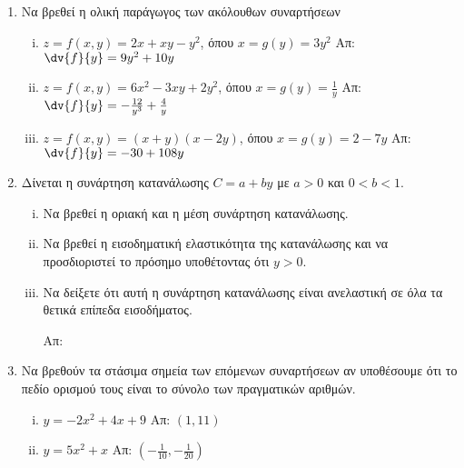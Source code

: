 \begin{enumerate}
  \item Να βρεθεί η ολική παράγωγος των ακόλουθων συναρτήσεων

    \begin{enumerate}[i)]
      \item $ z = f(x,y) = 2x+xy-y^{2} $, όπου $ x = g(y) = 3y^{2} 
        $ \hfill Απ: $ \dv{f}{y} = 9y^{2}+10y $ 
      \item $ z = f(x,y) = 6x^{2}-3xy+2y^{2} $, όπου $ x = g(y) = \frac{1}{y} $
        \hfill Απ: $ \dv{f}{y} = - \frac{12}{y^{3}} + \frac{4}{y} $
      \item $ z = f(x,y) = (x+y)(x-2y) $, όπου $ x = g(y) = 2-7y $
        \hfill Απ: $ \dv{f}{y} = -30 + 108y $ 
    \end{enumerate}

  \item Δίνεται η συνάρτηση κατανάλωσης $ C=a+by $ με $ a>0 $ και $ 0<b<1 $.

    \begin{enumerate}[i)]
      \item Να βρεθεί η οριακή και η μέση συνάρτηση κατανάλωσης. 
      \item Να βρεθεί η εισοδηματική ελαστικότητα της κατανάλωσης και να προσδιοριστεί το
        πρόσημο υποθέτοντας ότι $ y>0 $. 
      \item Να δείξετε ότι αυτή η συνάρτηση κατανάλωσης είναι ανελαστική σε όλα τα θετικά
        επίπεδα εισοδήματος. 

        \hfill Απ:  
    \end{enumerate}

  \item Να βρεθούν τα στάσιμα σημεία των επόμενων συναρτήσεων αν υποθέσουμε ότι το πεδίο ορισμού
    τους είναι το σύνολο των πραγματικών αριθμών.

    \begin{enumerate}[i)]
      \item $ y = -2x^{2}+4x+9 $ \hfill Απ: $ (1,11) $
      \item $ y = 5x^{2}+x $ \hfill Απ: $ \left(- \frac{1}{10}, - \frac{1}{20}\right) $ 
    \end{enumerate}


\end{enumerate}
